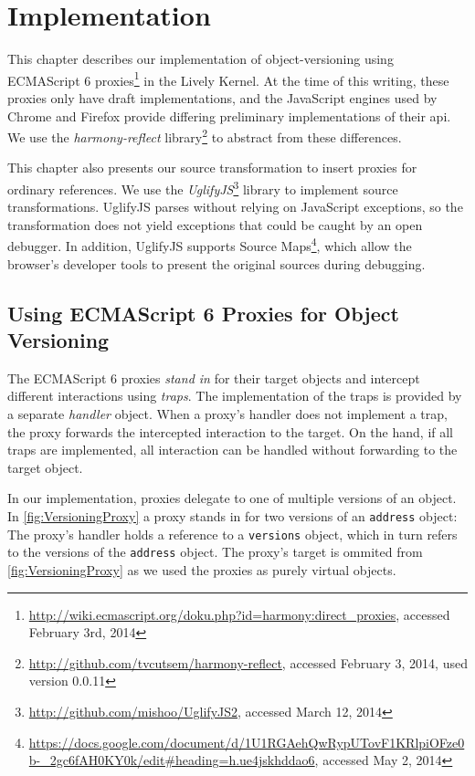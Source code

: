 \documentclass{sigplanconf}
\newcommand{\ac}[1]{\gls{#1}}
\begin{document}
\section{Implementation} \label{chapter:IMPLEMENTATION}

This chapter describes our implementation of object-versioning using ECMAScript 6 proxies\footnote{\url{http://wiki.ecmascript.org/doku.php?id=harmony:direct_proxies}, accessed February 3rd, 2014} in the Lively Kernel.
At the time of this writing, these proxies only have draft implementations, and the JavaScript engines used by Chrome and Firefox provide differing preliminary implementations of their \ac{api}.
We use the \emph{harmony-reflect} library\footnote{\url{http://github.com/tvcutsem/harmony-reflect}, accessed February 3, 2014, used version 0.0.11} to abstract from these differences.

This chapter also presents our source transformation to insert proxies for ordinary references.
We use the \emph{UglifyJS}\footnote{\url{http://github.com/mishoo/UglifyJS2}, accessed March 12, 2014} library to implement source transformations.
UglifyJS parses without relying on JavaScript exceptions, so the transformation does not yield exceptions that could be caught by an open debugger.
In addition, UglifyJS supports Source Maps\footnote{\url{https://docs.google.com/document/d/1U1RGAehQwRypUTovF1KRlpiOFze0b-_2gc6fAH0KY0k/edit\#heading=h.ue4jskhddao6}, accessed May 2, 2014}, which allow the browser's developer tools to present the original sources during debugging.

\subsection{Using ECMAScript 6 Proxies for Object Versioning} \label{subsec:IMPLEMENTATION:1.2}

The ECMAScript 6 proxies \emph{stand in} for their target objects and intercept different interactions using \emph{traps}.
The implementation of the traps is provided by a separate \emph{handler} object.
When a proxy's handler does not implement a trap, the proxy forwards the intercepted interaction to the target.
On the hand, if all traps are implemented, all interaction can be handled without forwarding to the target object.

In our implementation, proxies delegate to one of multiple versions of an object.
In \autoref{fig:VersioningProxy} a proxy stands in for two versions of an \lstinline{address} object: The proxy's handler holds a reference to a \lstinline{versions} object, which in turn refers to the versions of the \lstinline{address} object.
The proxy's target is ommited from \autoref{fig:VersioningProxy} as we used the proxies as purely virtual objects.
\end{document}
